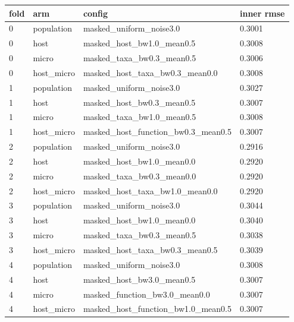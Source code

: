 {\footnotesize\setlength{\tabcolsep}{3pt}
\begin{longtable}{llll}
\toprule
\textbf{fold} & \textbf{arm} & \textbf{config} & \textbf{inner rmse} \\
\midrule
\endhead
0 & population & masked\_uniform\_noise3.0 & 0.3001 \\
0 & host & masked\_host\_bw1.0\_mean0.5 & 0.3008 \\
0 & micro & masked\_taxa\_bw0.3\_mean0.5 & 0.3006 \\
0 & host\_micro & masked\_host\_taxa\_bw0.3\_mean0.0 & 0.3008 \\
1 & population & masked\_uniform\_noise3.0 & 0.3027 \\
1 & host & masked\_host\_bw0.3\_mean0.5 & 0.3007 \\
1 & micro & masked\_taxa\_bw1.0\_mean0.5 & 0.3008 \\
1 & host\_micro & masked\_host\_function\_bw0.3\_mean0.5 & 0.3007 \\
2 & population & masked\_uniform\_noise3.0 & 0.2916 \\
2 & host & masked\_host\_bw1.0\_mean0.0 & 0.2920 \\
2 & micro & masked\_taxa\_bw0.3\_mean0.0 & 0.2920 \\
2 & host\_micro & masked\_host\_taxa\_bw1.0\_mean0.0 & 0.2920 \\
3 & population & masked\_uniform\_noise3.0 & 0.3044 \\
3 & host & masked\_host\_bw1.0\_mean0.0 & 0.3040 \\
3 & micro & masked\_taxa\_bw0.3\_mean0.5 & 0.3038 \\
3 & host\_micro & masked\_host\_taxa\_bw0.3\_mean0.5 & 0.3039 \\
4 & population & masked\_uniform\_noise3.0 & 0.3008 \\
4 & host & masked\_host\_bw3.0\_mean0.5 & 0.3007 \\
4 & micro & masked\_function\_bw3.0\_mean0.0 & 0.3007 \\
4 & host\_micro & masked\_host\_function\_bw1.0\_mean0.5 & 0.3007 \\
\bottomrule
\end{longtable}}
